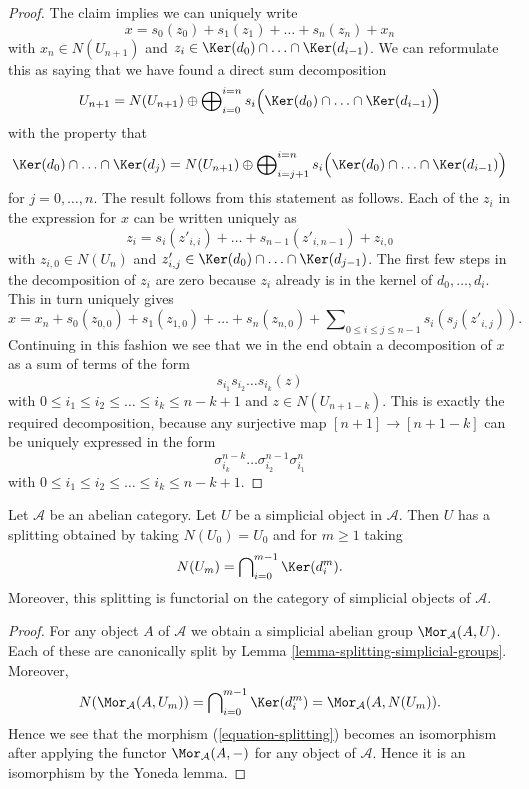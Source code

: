 \begin{proof}
\medskip\noindent
The claim implies we can uniquely write
$$
x = s_0(z_0) + s_1(z_1) + \ldots + s_n(z_n) + x_n
$$
with $x_n \in N(U_{n + 1})$ and
$z_i \in \Ker(d_0) \cap \ldots \cap \Ker(d_{i - 1})$.
We can reformulate this as saying that we have found a direct
sum decomposition
$$
U_{n + 1}
=
N(U_{n + 1})
\oplus
\bigoplus\nolimits_{i = 0}^{i = n}
s_i\Big(\Ker(d_0) \cap \ldots \cap \Ker(d_{i - 1})\Big)
$$
with the property that
$$
\Ker(d_0) \cap \ldots \cap \Ker(d_j)
=
N(U_{n + 1}) \oplus
\bigoplus\nolimits_{i = j + 1}^{i = n}
s_i\Big(\Ker(d_0) \cap \ldots \cap \Ker(d_{i - 1})\Big)
$$
for $j = 0, \ldots, n$.
The result follows from this statement as follows.
Each of the $z_i$ in the expression for $x$
can be written uniquely as
$$
z_i = s_i(z'_{i, i}) + \ldots + s_{n - 1}(z'_{i, n - 1}) + z_{i, 0}
$$
with $z_{i, 0} \in N(U_n)$ and
$z'_{i, j} \in \Ker(d_0) \cap \ldots \cap \Ker(d_{j - 1})$.
The first few steps in the decomposition of $z_i$ are zero because
$z_i$ already is in the kernel of $d_0, \ldots, d_i$.
This in turn uniquely gives
$$
x = x_n + s_0(z_{0, 0}) + s_1(z_{1, 0}) + \ldots + s_n(z_{n, 0}) +
\sum\nolimits_{0 \leq i \leq j \leq n - 1} s_i(s_j(z'_{i, j})).
$$
Continuing in this fashion we see that we in the end obtain
a decomposition of $x$ as a sum of terms
of the form
$$
s_{i_1} s_{i_2} \ldots s_{i_k} (z)
$$
with $0 \leq i_1 \leq i_2 \leq \ldots \leq i_k \leq n - k + 1$ and
$z \in N(U_{n + 1 - k})$. This is exactly the required
decomposition, because any surjective map $[n + 1] \to [n + 1 - k]$
can be uniquely expressed in the form
$$
\sigma^{n - k}_{i_k} \ldots \sigma^{n - 1}_{i_2} \sigma^n_{i_1}
$$
with $0 \leq i_1 \leq i_2 \leq \ldots \leq i_k \leq n - k + 1$.
\end{proof}

\begin{lemma}
\label{lemma-splitting-abelian-category}
Let $\mathcal{A}$ be an abelian category.
Let $U$ be a simplicial object in $\mathcal{A}$.
Then $U$ has a splitting obtained by taking $N(U_0) = U_0$ and
for $m \geq 1$ taking
$$
N(U_m) = \bigcap\nolimits_{i = 0}^{m - 1} \Ker(d^m_i).
$$
Moreover, this splitting is functorial on the category of
simplicial objects of $\mathcal{A}$.
\end{lemma}

\begin{proof}
For any object $A$ of $\mathcal{A}$ we obtain
a simplicial abelian group $\Mor_\mathcal{A}(A, U)$.
Each of these are canonically split by Lemma
\ref{lemma-splitting-simplicial-groups}. Moreover,
$$
N(\Mor_\mathcal{A}(A, U_m)) =
\bigcap\nolimits_{i = 0}^{m - 1} \Ker(d^m_i) =
\Mor_\mathcal{A}(A, N(U_m)).
$$
Hence we see that the morphism (\ref{equation-splitting})
becomes an isomorphism after applying the functor
$\Mor_\mathcal{A}(A, -)$ for any object of $\mathcal{A}$.
Hence it is an isomorphism by the Yoneda lemma.
\end{proof}

